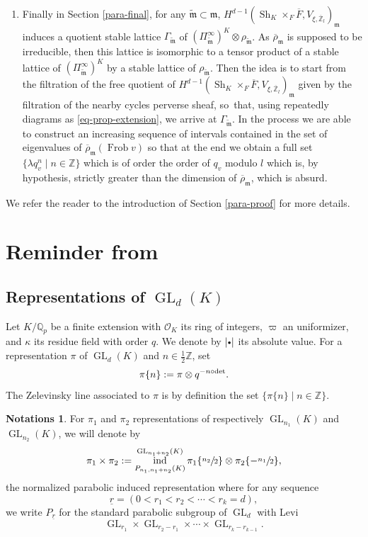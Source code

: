\documentclass[11pt]{article}
\newcommand{\NoChangel}[1]{%
\expandafter\let\csname old\string#1\endcsname=#1
\let#1=\relax
\newcommand{#1}{\mathcode`l="716C\csname old\string#1\endcsname\mathcode`l="7160 }%
}
\let\sep\mid
\newcommand{\sbullet}{{\scriptscriptstyle\bullet}}
\newcommand{\csbullet}{{\raisebox{1pt}{$\sbullet$}}}
\DeclareMathOperator{\GL}{GL}
\theoremstyle{plain}
\theoremstyle{definition}
\newtheorem{notas}[equation]{Notations}
\numberwithin{equation}{subsection}
\newcommand\Qm{{\mathbb Q}}
\newcommand\Zm{{\mathbb Z}}
\newcommand\OC{{\mathcal O}}
\DeclareMathOperator{\sh}{Sh}
\DeclareMathOperator{\val}{val}\NoChangel{\val}
\DeclareMathOperator{\frob}{Frob}
\DeclareMathOperator{\ind}{ind}
\let \oo=\infty
\begin{document}
\begin{enumerate}
\item
Finally in Section \ref{para-final},
for any $\widetilde{\mathfrak m} \subset \mathfrak m$,
$H^{d-1}(\sh_K \times_F \overline F,V_{\xi,\overline \Zm_l})_{\mathfrak m}$
induces a quotient stable lattice $\Gamma_{\widetilde{\mathfrak m}}$ of $(\Pi_{\widetilde{\mathfrak m}}^{\oo})^K \otimes
\rho_{\widetilde{\mathfrak m}}$. As
$\overline \rho_{\mathfrak m}$ is supposed to be irreducible, then this
lattice is isomorphic to a tensor product of a stable lattice of
$(\Pi_{\widetilde{\mathfrak m}}^{\oo})^K$ by a stable lattice of
$\rho_{\widetilde{\mathfrak m}}$. Then the idea is to start from the filtration
of the free quotient of $H^{d-1}(\sh_K \times_F \overline F,
V_{\xi,\overline \Zm_l})_{\mathfrak m}$ given
by the filtration of the nearby cycles perverse sheaf, so~that, using repeatedly
diagrams as \eqref{eq-prop-extension}, we arrive at $\Gamma_{\widetilde{\mathfrak m}}$.
In the process we are able to construct an increasing sequence of intervals
contained in the set of eigenvalues of $\overline \rho_{\mathfrak m}(\frob v)$
so that at the end we obtain a full set $\{\lambda q_v^n \sep n \in \Zm\}$
which is of order the order of $q_v$ modulo $l$ which is, by hypothesis,
strictly greater than the dimension of $\overline \rho_{\mathfrak m}$, which is
absurd.
\end{enumerate}

We refer the reader to the introduction of Section \ref{para-proof} for more details.

\section{\texorpdfstring{Reminder from \cite{boyer-imj}}{R}}

\subsection{Representations of $\GL_d(K)$}
\label{para-gen}

Let $K/\Qm_p$ be a finite extension with $\OC_K$ its ring of integers,
$\varpi$ an uniformizer, and
$\kappa$ its residue field with order $q$.
We denote by $|\csbullet|$ its absolute value.
For a representation $\pi$ of $\GL_d(K)$ and $n \in \frac{1}{2} \Zm$, set
\[
\pi \{n\}:= \pi \otimes q^{-n \val \circ \det}.
\]
The Zelevinsky line associated to $\pi$ is by definition the set
$\{\pi \{n\}\sep n \in \Zm\}$.

\begin{notas} \label{nota-ind}
For $\pi_1$ and $\pi_2$ representations of respectively $\GL_{n_1}(K)$ and
$\GL_{n_2}(K)$, we will denote by
\[
\pi_1 \times \pi_2:=\ind_{P_{n_1,n_1+n_2}(K)}^{\GL_{n_1+n_2}(K)}
\pi_1 \{\sfrac{n_2}{2}\} \otimes \pi_2 \{-\sfrac{n_1}{2}\},
\]
the normalized parabolic induced representation where for any sequence
\[
\underline r=(0< r_1 < r_2 < \cdots < r_k=d),
\]
we write $P_{\underline r}$ for
the standard parabolic subgroup of $\GL_d$ with Levi
\[
\GL_{r_1} \times \GL_{r_2-r_1} \times \cdots \times \GL_{r_k-r_{k-1}}.
\]
\end{notas}
\end{document}
